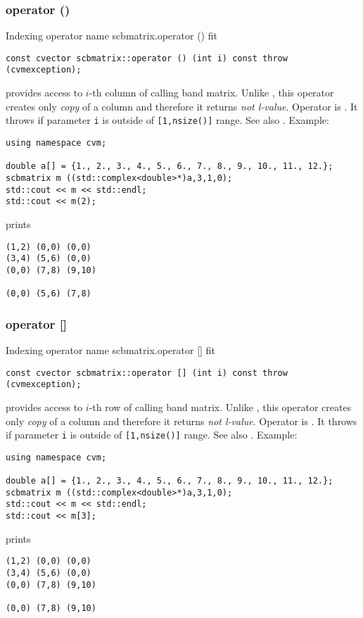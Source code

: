 \subsubsection{operator ()}
Indexing operator%
\pdfdest name {scbmatrix.operator ()} fit
\begin{verbatim}
const cvector scbmatrix::operator () (int i) const throw (cvmexception);
\end{verbatim}
provides access to \hbox{$i$-th} column of calling band matrix.
Unlike ,
this operator creates only  \emph{copy} of a column and therefore 
it returns
\emph{not  l-value}.
Operator is \Based.
It throws 
if  parameter \verb"i" is outside of \verb"[1,nsize()]" range.
See also .
Example:
\begin{Verbatim}
using namespace cvm;

double a[] = {1., 2., 3., 4., 5., 6., 7., 8., 9., 10., 11., 12.};
scbmatrix m ((std::complex<double>*)a,3,1,0);
std::cout << m << std::endl;
std::cout << m(2);
\end{Verbatim}
prints
\begin{Verbatim}
(1,2) (0,0) (0,0)
(3,4) (5,6) (0,0)
(0,0) (7,8) (9,10)

(0,0) (5,6) (7,8)
\end{Verbatim}
\newpage



\subsubsection{operator []}
Indexing operator%
\pdfdest name {scbmatrix.operator []} fit
\begin{verbatim}
const cvector scbmatrix::operator [] (int i) const throw (cvmexception);
\end{verbatim}
provides access to  \hbox{$i$-th} row of calling band matrix.
Unlike ,
this operator creates only  \emph{copy} of a column and therefore 
it returns
\emph{not  l-value}.
Operator is \Based.
It throws 
if parameter \verb"i" is outside of \verb"[1,nsize()]" range.
See also .
Example:
\begin{Verbatim}
using namespace cvm;

double a[] = {1., 2., 3., 4., 5., 6., 7., 8., 9., 10., 11., 12.};
scbmatrix m ((std::complex<double>*)a,3,1,0);
std::cout << m << std::endl;
std::cout << m[3];
\end{Verbatim}
prints
\begin{Verbatim}
(1,2) (0,0) (0,0)
(3,4) (5,6) (0,0)
(0,0) (7,8) (9,10)

(0,0) (7,8) (9,10)
\end{Verbatim}
\newpage




